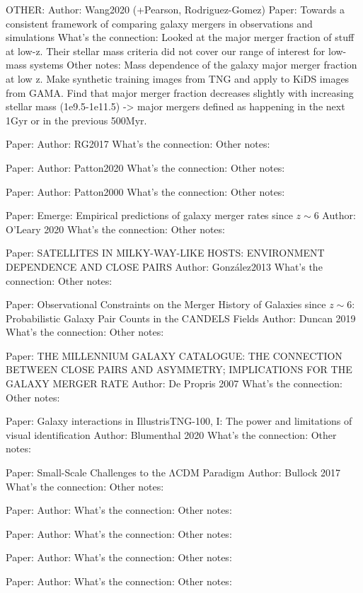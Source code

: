 OTHER:
    Author: Wang2020 (+Pearson, Rodriguez-Gomez)
    Paper: Towards a consistent framework of comparing galaxy mergers in observations and simulations
    What's the connection: Looked at the major merger fraction of stuff at low-z. Their stellar mass criteria did not cover our range of interest for low-mass systems
    Other notes: Mass dependence of the galaxy major merger fraction at low z. Make synthetic training images from TNG and apply to KiDS images from GAMA. Find that major merger fraction decreases slightly with increasing stellar mass (1e9.5-1e11.5) -> 
    major mergers defined as happening in the next 1Gyr or in the previous 500Myr. 
    
    Paper: 
    Author: RG2017
    What's the connection: 
    Other notes: 
    
    
    
    Paper: 
    Author: Patton2020
    What's the connection:
    Other notes:
    
    Paper: 
    Author: Patton2000
    What's the connection:
    Other notes:
    
    
    
    Paper: Emerge: Empirical predictions of galaxy merger rates since $z \sim 6$ 
    Author: O'Leary 2020
    What's the connection:
    Other notes:
    
    
    
    
    Paper: SATELLITES IN MILKY-WAY-LIKE HOSTS: ENVIRONMENT DEPENDENCE AND CLOSE PAIRS
    Author: González2013
    What's the connection:
    Other notes:
    
    Paper: Observational Constraints on the Merger History of Galaxies since $z\sim6$: Probabilistic Galaxy Pair Counts in the CANDELS Fields
    Author: Duncan 2019
    What's the connection:
    Other notes:
    
    Paper: THE MILLENNIUM GALAXY CATALOGUE: THE CONNECTION BETWEEN CLOSE PAIRS AND ASYMMETRY; IMPLICATIONS FOR THE GALAXY MERGER RATE
    Author: De Propris 2007
    What's the connection:
    Other notes:
    
    Paper: Galaxy interactions in IllustrisTNG-100, I: The power and limitations of visual identification
    Author: Blumenthal 2020
    What's the connection:
    Other notes:
    
    Paper: Small-Scale Challenges to the ΛCDM Paradigm
    Author: Bullock 2017
    What's the connection:
    Other notes:
    
    Paper:
    Author:
    What's the connection:
    Other notes:
    
    Paper:
    Author:
    What's the connection:
    Other notes:
    
    Paper:
    Author:
    What's the connection:
    Other notes:
    
    Paper:
    Author:
    What's the connection:
    Other notes: